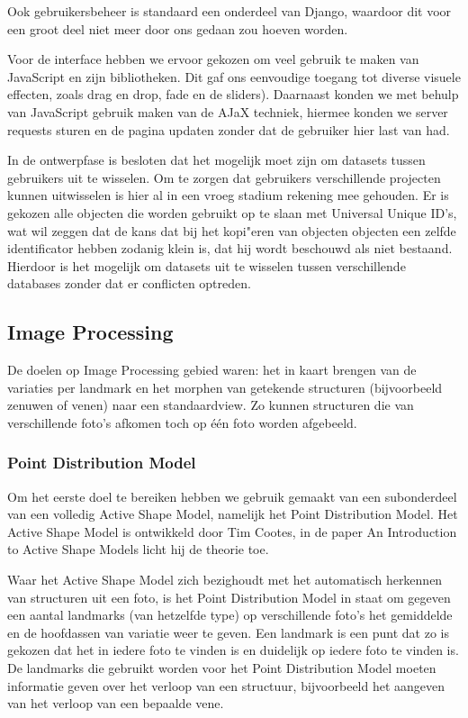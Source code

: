 Ook gebruikers\-beheer is standaard een onderdeel van Django, waardoor dit voor een groot deel niet meer door ons gedaan zou hoeven worden.

Voor de interface hebben we ervoor gekozen om veel gebruik te maken van JavaScript en zijn bibliotheken. Dit gaf ons eenvoudige toegang tot diverse visuele effecten, zoals drag en drop, fade en de sliders). Daarnaast konden we met behulp van JavaScript gebruik maken van de AJaX techniek, hiermee konden we server requests sturen en de pagina updaten zonder dat de gebruiker hier last van had.

In de ontwerpfase is besloten dat het mogelijk moet zijn om datasets tussen gebruikers uit te wisselen. Om te zorgen dat gebruikers verschillende projecten kunnen uitwisselen is hier al in een vroeg stadium rekening mee gehouden. Er is gekozen alle objecten die worden gebruikt op te slaan met Universal Unique ID's, wat wil zeggen dat de kans dat bij het kopi"{e}ren van objecten objecten een zelfde identificator hebben zodanig klein is, dat hij wordt beschouwd als niet bestaand. Hierdoor is het mogelijk om datasets uit te wisselen tussen verschillende databases zonder dat er conflicten optreden.

\subsection{Image Processing}
\label{aanpak_image_processing}
De doelen op Image Processing gebied waren: het in kaart brengen van de variaties per landmark en het morphen van getekende structuren (bijvoorbeeld zenuwen of venen) naar een standaardview. Zo kunnen structuren die van verschillende foto's afkomen toch op \'{e}\'{e}n foto worden afgebeeld.

\subsubsection{Point Distribution Model}
Om het eerste doel te bereiken hebben we gebruik gemaakt van een subonderdeel van een volledig Active Shape Model, namelijk het Point Distribution Model. Het Active Shape Model is ontwikkeld door Tim Cootes, in de paper An Introduction to Active Shape Models licht hij de theorie toe.\cite{introASM}

Waar het Active Shape Model zich bezighoudt met het automatisch herkennen van structuren uit een foto, is het Point Distribution Model\cite{pdm} in staat om gegeven een aantal landmarks (van hetzelfde type) op verschillende foto's het gemiddelde en de hoofdassen van variatie weer te geven. Een landmark is een punt dat zo is gekozen dat het in iedere foto te vinden is en duidelijk op iedere foto te vinden is. De landmarks die gebruikt worden voor het Point Distribution Model moeten informatie geven over het verloop van een structuur, bijvoorbeeld het aangeven van het verloop van een bepaalde vene.

